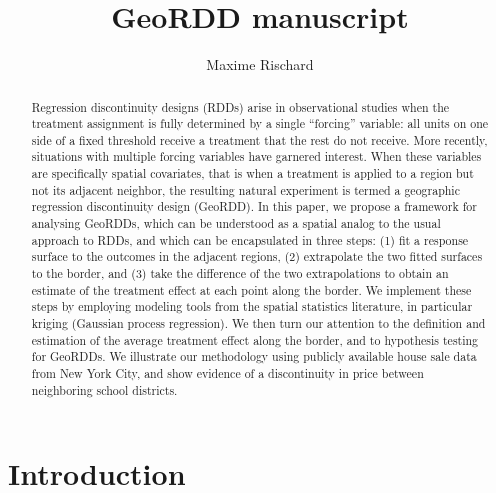 \documentclass[letter]{article}
\title{GeoRDD manuscript}
\author{Maxime Rischard}
\begin{document}
    
    
    
    \maketitle
    
    
	\tableofcontents


    




\begin{abstract}
    	Regression discontinuity designs (RDDs) arise in observational studies when the treatment assignment is fully determined by a single ``forcing'' variable: all units on one side of a fixed threshold receive a treatment that the rest do not receive.
More recently, situations with multiple forcing variables have garnered interest.
When these variables are specifically spatial covariates, that is when a treatment is applied to a region but not its adjacent neighbor, the resulting natural experiment is termed a geographic regression discontinuity design (GeoRDD).
In this paper, we propose a framework for analysing GeoRDDs, which can be understood as a spatial analog to the usual approach to RDDs, and which can be encapsulated in three steps:
(1) fit a response surface to the outcomes in the adjacent regions,
(2) extrapolate the two fitted surfaces to the border, and
(3) take the difference of the two extrapolations to obtain an estimate of the treatment effect at each point along the border.
We implement these steps by employing modeling tools from the spatial statistics literature, in particular kriging (Gaussian process regression).
We then turn our attention to the definition and estimation of the average treatment effect along the border, and to hypothesis testing for GeoRDDs.
We illustrate our methodology using publicly available house sale data from New York City,
and show evidence of a discontinuity in price between neighboring school districts.
    

\end{abstract}
    	\section{Introduction}\label{introduction}
\end{document}
